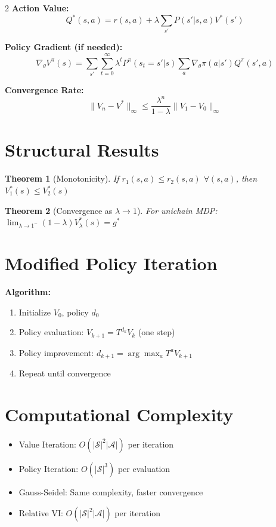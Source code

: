 \documentclass[8pt]{extarticle}
\newtheorem{theorem}{Theorem}
\begin{document}
\begin{multicols}{2}
\textbf{Action Value:}
$$Q^*(s,a) = r(s,a) + \lambda \sum_{s'} P(s'|s,a) V^*(s')$$

\textbf{Policy Gradient (if needed):}
$$\nabla_\theta V^\pi(s) = \sum_{s'} \sum_{t=0}^\infty \lambda^t P^\pi(s_t = s'|s) \sum_a \nabla_\theta \pi(a|s') Q^\pi(s',a)$$

\textbf{Convergence Rate:}
$$\|V_n - V^*\|_\infty \leq \frac{\lambda^n}{1-\lambda} \|V_1 - V_0\|_\infty$$

\section*{\textcolor{theoremblue}{Structural Results}}
\begin{theorem}[Monotonicity]
If $r_1(s,a) \leq r_2(s,a)$ $\forall (s,a)$, then $V_1^*(s) \leq V_2^*(s)$
\end{theorem}

\begin{theorem}[Convergence as $\lambda \to 1$]
For unichain MDP: $\lim_{\lambda \to 1^-} (1-\lambda) V_\lambda^*(s) = g^*$
\end{theorem}

\section*{\textcolor{algorithmgreen}{Modified Policy Iteration}}
\textbf{Algorithm:}
\begin{enumerate}[leftmargin=*]
    \item Initialize $V_0$, policy $d_0$
    \item Policy evaluation: $V_{k+1} = T^{d_k} V_k$ (one step)
    \item Policy improvement: $d_{k+1} = \arg\max_a T^a V_{k+1}$
    \item Repeat until convergence
\end{enumerate}

\section*{\textcolor{formulared}{Computational Complexity}}
\begin{itemize}[leftmargin=*]
    \item Value Iteration: $O(|\mathcal{S}|^2 |\mathcal{A}|)$ per iteration
    \item Policy Iteration: $O(|\mathcal{S}|^3)$ per evaluation
    \item Gauss-Seidel: Same complexity, faster convergence
    \item Relative VI: $O(|\mathcal{S}|^2 |\mathcal{A}|)$ per iteration
\end{itemize}


\end{multicols}
\end{document}
